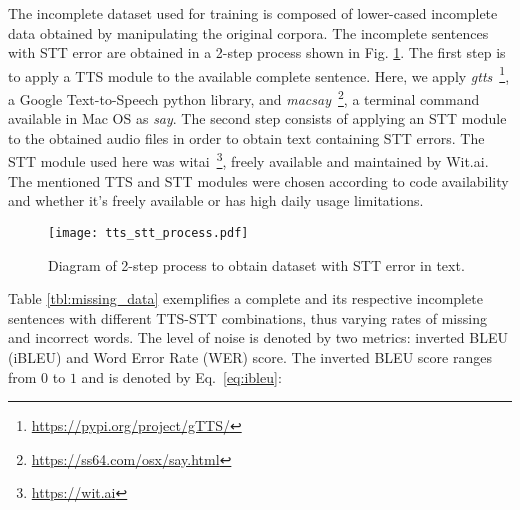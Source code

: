\documentclass[review]{elsarticle}
\begin{document}
\begin{table}[ht!]
  \caption{Details about our Incomplete Intent Classification dataset based on the Chatbot NLU Evaluation Corpus.}
  \label{tbl:corpus_info}
  \bigskip
  \centering
\end{table}

The incomplete dataset used for training is composed of lower-cased incomplete data obtained by manipulating the original corpora. The incomplete sentences with STT error are obtained in a 2-step process shown in Fig. \ref{fig:tts_stt_process}. The first step is to apply a TTS module to the available complete sentence. Here, we apply \textit{gtts}~\footnote{\url{https://pypi.org/project/gTTS/}}, a Google Text-to-Speech python library, and \textit{macsay}~\footnote{\url{https://ss64.com/osx/say.html}}, a terminal command available in Mac OS as \textit{say}. The second step consists of applying an STT module to the obtained audio files in order to obtain text containing STT errors. The STT module used here was witai~\footnote{\url{https://wit.ai}}, freely available and maintained by Wit.ai. The mentioned TTS and STT modules were chosen according to code availability and whether it's freely available or has high daily usage limitations.

\begin{figure}
    \centering
    \texttt{[image: tts\_stt\_process.pdf]}
    \caption{Diagram of 2-step process to obtain dataset with STT error in text.}
    \label{fig:tts_stt_process}
\end{figure}

Table \ref{tbl:missing_data} exemplifies a complete and its respective incomplete sentences with different TTS-STT combinations, thus varying rates of missing and incorrect words. The level of noise is denoted by two metrics: inverted BLEU (iBLEU) and Word Error Rate (WER) score. The inverted BLEU score ranges from $0$ to $1$ and is denoted by Eq.~\eqref{eq:ibleu}:
\end{document}
